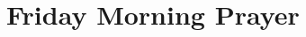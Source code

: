 \documentclass[12pt,twocolumn]{book}
\begin{document}










\section{Friday Morning Prayer}


\end{document}
